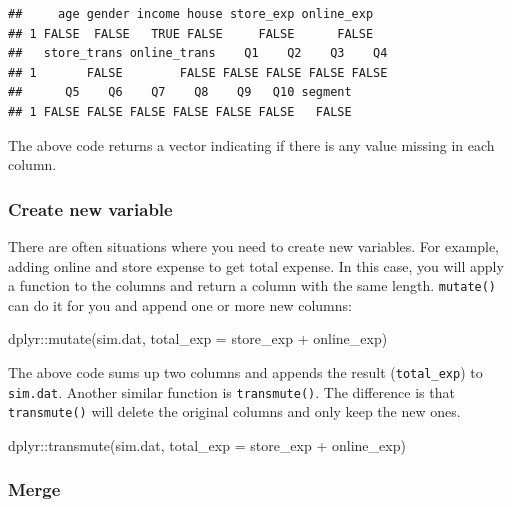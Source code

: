 \documentclass[
  12pt,
]{krantz}
\makeatletter
\newenvironment{Shaded}{\begin{snugshade}}{\end{snugshade}}
\newcommand{\AttributeTok}[1]{\textcolor[rgb]{0.61,0.61,0.61}{#1}}
\newcommand{\FunctionTok}[1]{\textcolor[rgb]{0,0,0}{#1}}
\newcommand{\NormalTok}[1]{#1}
\newcommand{\SpecialCharTok}[1]{\textcolor[rgb]{0,0,0}{#1}}
\newenvironment{kframe}{%
\medskip{}
\setlength{\fboxsep}{.8em}
 \def\at@end@of@kframe{}%
 \ifinner\ifhmode%
  \def\at@end@of@kframe{\end{minipage}}%
  \begin{minipage}{\columnwidth}%
 \fi\fi%
 \def\FrameCommand##1{\hskip\@totalleftmargin \hskip-\fboxsep
 \colorbox{shadecolor}{##1}\hskip-\fboxsep
     \hskip-\linewidth \hskip-\@totalleftmargin \hskip\columnwidth}%
 \MakeFramed {\advance\hsize-\width
   \@totalleftmargin\z@ \linewidth\hsize
   \@setminipage}}%
 {\par\unskip\endMakeFramed%
 \at@end@of@kframe}
\renewenvironment{Shaded}{\begin{kframe}}{\end{kframe}}
\makeatother
\begin{document}
\begin{verbatim}
##     age gender income house store_exp online_exp
## 1 FALSE  FALSE   TRUE FALSE     FALSE      FALSE
##   store_trans online_trans    Q1    Q2    Q3    Q4
## 1       FALSE        FALSE FALSE FALSE FALSE FALSE
##      Q5    Q6    Q7    Q8    Q9   Q10 segment
## 1 FALSE FALSE FALSE FALSE FALSE FALSE   FALSE
\end{verbatim}

The above code returns a vector indicating if there is any value missing in each column.

\hypertarget{create-new-variable}{%
\subsubsection{Create new variable}\label{create-new-variable}}

There are often situations where you need to create new variables. For example, adding online and store expense to get total expense. In this case, you will apply a function to the columns and return a column with the same length. \texttt{mutate()} can do it for you and append one or more new columns:

\begin{Shaded}
\begin{Highlighting}[]
\NormalTok{dplyr}\SpecialCharTok{::}\FunctionTok{mutate}\NormalTok{(sim.dat, }\AttributeTok{total\_exp =}\NormalTok{ store\_exp }\SpecialCharTok{+}\NormalTok{ online\_exp)}
\end{Highlighting}
\end{Shaded}

The above code sums up two columns and appends the result (\texttt{total\_exp}) to \texttt{sim.dat}. Another similar function is \texttt{transmute()}. The difference is that \texttt{transmute()} will delete the original columns and only keep the new ones.

\begin{Shaded}
\begin{Highlighting}[]
\NormalTok{dplyr}\SpecialCharTok{::}\FunctionTok{transmute}\NormalTok{(sim.dat, }\AttributeTok{total\_exp =}\NormalTok{ store\_exp }\SpecialCharTok{+}\NormalTok{ online\_exp)}
\end{Highlighting}
\end{Shaded}

\hypertarget{merge}{%
\subsubsection{Merge}\label{merge}}
\end{document}
